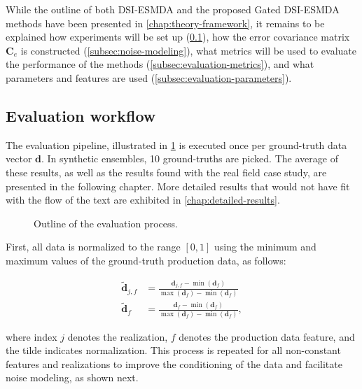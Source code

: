 While the outline of both DSI-ESMDA and the proposed Gated DSI-ESMDA methods have been presented in \cref{chap:theory-framework},
it remains to be explained 
how experiments will be set up (\cref{subsec:evaluation-workflow}), 
how the error covariance matrix $\mathbf{C}_e$ is constructed (\cref{subsec:noise-modeling}),
what metrics will be used to evaluate the performance of the methods (\cref{subsec:evaluation-metrics}), and
what parameters  and features are used (\cref{subsec:evaluation-parameters}). 

\subsection{Evaluation workflow}
\label{subsec:evaluation-workflow}
%
The evaluation pipeline, illustrated in \cref{fig:flowchart-evaluation}
is executed once per ground-truth data vector $\mathbf{d}$.
%
In synthetic ensembles, 10 ground-truths are picked.
%
The average of these results, as well as the results found with the real field case study,
are presented in the following chapter.
%
More detailed results that would not have fit with the flow of the text 
are exhibited in \cref{chap:detailed-results}. 

\begin{figure}[htbp]
    \centering
    \caption{%
        Outline of the evaluation process. 
    }
    \label{fig:flowchart-evaluation}
    \scalebox{0.98}{%
        
    }
\end{figure}

First, all data is normalized to the range $[0, 1]$ using the minimum and maximum values of the ground-truth production data, as follows:

\begin{align}
    \widetilde{\mathbf{d}}_{j, f} &= \frac{\mathbf{d}_{j, f} - \min(\mathbf{d}_f)}{\max(\mathbf{d}_f) - \min(\mathbf{d}_f)}
\label{eq:normalize_realization} \\
    \widetilde{\mathbf{d}}_f      &= \frac{\mathbf{d}_f -      \min(\mathbf{d}_f)}{\max(\mathbf{d}_f) - \min(\mathbf{d}_f)},
\label{eq:normalize_ground-truth}
\end{align}

where index $j$ denotes the realization, $f$ denotes the production data feature, and the tilde indicates normalization.
This process is repeated for all non-constant features
and realizations to improve the conditioning of the data and facilitate noise modeling, as shown next.

